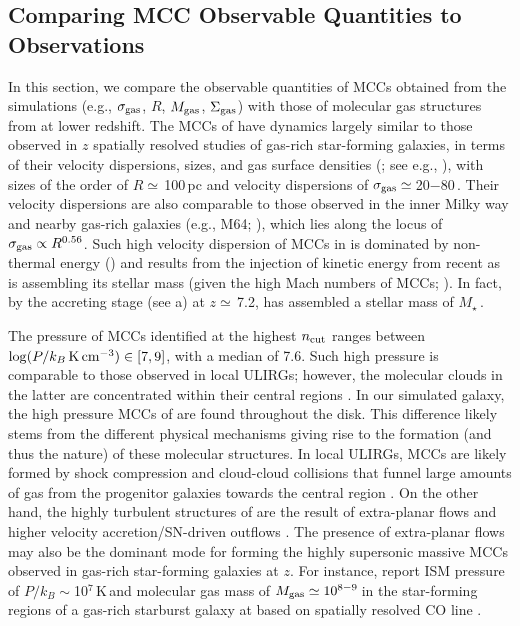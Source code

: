 \IfFileExists{emulateapjlegacy.cls}{\documentclass[iop]{emulateapjlegacy}}{\documentclass[iop]{emulateapj}}
\begin{document}
\subsection{Comparing MCC Observable Quantities to Observations} \label{sec:diss1}

In this section, we compare the observable quantities of MCCs obtained from the simulations (e.g., $\sigma_{\rm gas}$, $R$, $M_{\rm gas}$, $\Sigma_{\rm gas}$) with those of molecular gas structures from \obs at lower redshift.
The MCCs of \flower have dynamics largely similar to those observed in $z$ spatially resolved studies of gas-rich star-forming galaxies, in terms of their velocity dispersions, sizes, and gas surface densities (; see e.g., \citealt{Swinbank11a}), with sizes of the order of $R\simeq$\,100\,pc and velocity dispersions of $\sigma_{\rm gas}\simeq$\,20$-$80\,\kms.
%
Their velocity dispersions are also comparable to those observed in the inner Milky way and nearby gas-rich galaxies (e.g., M64; \citealt{Oka01a, Rosolowsky05a, Heyer09a, Leroy15a}), which lies along the locus of $\sigma_{\rm gas}\propto R^{0.56}$. Such high velocity dispersion of MCCs in \flower is dominated by non-thermal energy () and results from the injection of kinetic energy from recent \SF as \flower is assembling its stellar mass (given the high Mach numbers of MCCs; ). In fact, by the accreting stage (see a) at $z\simeq$\,7.2, \flower has assembled a stellar mass of $M_\star$\,\Msun.

The pressure of MCCs identified at the highest $n_{\rm cut}$ ranges between $\log(P/k_B \,{\rm K}\,{\rm cm}^{-3})\in[7, 9]$, with a median of 7.6. Such high pressure is comparable to those observed in local ULIRGs; however, the molecular clouds in the latter are concentrated within their central regions \citep{Downes98a, Sakamoto08a}. In our simulated galaxy, the high pressure MCCs of \flower are found throughout the disk. This difference likely stems from the different physical mechanisms giving rise to the formation (and thus the nature) of these molecular structures.
%
In local ULIRGs, MCCs are likely formed by shock compression and cloud-cloud collisions that funnel large amounts of gas from the progenitor galaxies towards the central region \citep{Tan00a, Wu18a}. On the other hand, the highly turbulent structures of \flower are the result of extra-planar flows \citep{Kohandel19a} and higher velocity accretion/SN-driven outflows \citep{Gallerani18a}. The presence of extra-planar flows may also be the dominant mode for forming the highly supersonic massive MCCs observed in gas-rich star-forming galaxies at $z$. For instance, \citet{Swinbank11a} report ISM pressure of $P/k_B\sim$10$^7$\,K\,\cc and molecular gas mass of $M_{\rm gas}\simeq10^{8-9}$\,\Msun in the star-forming regions of a gas-rich starburst galaxy at \z{} based on spatially resolved CO line \obs.
\end{document}
